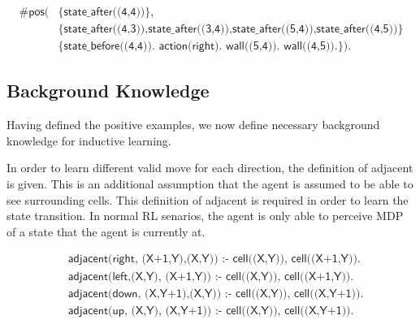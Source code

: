 \begin{examp}
\begin{equation}
\begin{split}
\textsf{\#pos(} & \textsf{\{state\_after((4,4))\}}, \\
                & \textsf{\{state\_after((4,3)),state\_after((3,4)),state\_after((5,4)),state\_after((4,5))\}} \\
                & \textsf{\{state\_before((4,4)). action(right). wall((5,4)). wall((4,5)).\}).}
\end{split}
\end{equation}

\end{examp}
\label{state_transition_example}

\subsection{Background Knowledge}
Having defined the positive examples, we now define necessary background knowledge for inductive learning.

In order to learn different valid move for each direction, the definition of adjacent is given. 
This is an additional assumption that the agent is assumed to be able to see surrounding cells. 
This definition of adjacent is required in order to learn the state transition.
In normal RL senarios, the agent is only able to perceive MDP of a state that the agent is currently at. 

\begin{equation}
\begin{split}
&\textsf{adjacent(right, (X+1,Y),(X,Y)) :- cell((X,Y)), cell((X+1,Y)).} \\
&\textsf{adjacent(left,(X,Y),  (X+1,Y)) :- cell((X,Y)), cell((X+1,Y)).} \\
&\textsf{adjacent(down, (X,Y+1),(X,Y)) :- cell((X,Y)), cell((X,Y+1)).} \\
&\textsf{adjacent(up,   (X,Y),  (X,Y+1)) :- cell((X,Y)), cell((X,Y+1)).} \\
\end{split}
\end{equation}





